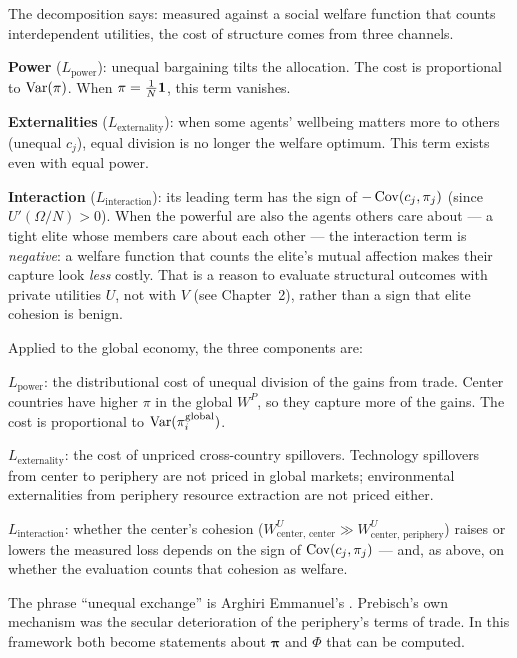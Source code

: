 \documentclass[../structural_economics_book.tex]{subfiles}
\begin{document}
\begin{intuition}
The decomposition says: measured against a social welfare function that counts interdependent utilities, the cost of structure comes from three channels.

\textbf{Power} ($L_{\text{power}}$): unequal bargaining tilts the allocation. The cost is proportional to $\operatorname{Var}(\pi)$. When $\pi = \frac{1}{N}\mathbf{1}$, this term vanishes.

\textbf{Externalities} ($L_{\text{externality}}$): when some agents' wellbeing matters more to others (unequal $c_j$), equal division is no longer the welfare optimum. This term exists even with equal power.

\textbf{Interaction} ($L_{\text{interaction}}$): its leading term has the sign of $-\operatorname{Cov}(c_j, \pi_j)$ (since $U'(\Omega/N) > 0$). When the powerful are also the agents others care about --- a tight elite whose members care about each other --- the interaction term is \textit{negative}: a welfare function that counts the elite's mutual affection makes their capture look \textit{less} costly. That is a reason to evaluate structural outcomes with private utilities $U$, not with $V$ (see Chapter~2), rather than a sign that elite cohesion is benign.
\end{intuition}

\begin{prebisch}
Applied to the global economy, the three components are:

$L_{\text{power}}$: the distributional cost of unequal division of the gains from trade. Center countries have higher $\pi$ in the global $W^P$, so they capture more of the gains. The cost is proportional to $\operatorname{Var}(\pi_i^{\text{global}})$.

$L_{\text{externality}}$: the cost of unpriced cross-country spillovers. Technology spillovers from center to periphery are not priced in global markets; environmental externalities from periphery resource extraction are not priced either.

$L_{\text{interaction}}$: whether the center's cohesion ($W^U_{\text{center, center}} \gg W^U_{\text{center, periphery}}$) raises or lowers the measured loss depends on the sign of $\operatorname{Cov}(c_j, \pi_j)$ --- and, as above, on whether the evaluation counts that cohesion as welfare.

The phrase ``unequal exchange'' is Arghiri Emmanuel's \citeyearpar{emmanuel1969echange}. Prebisch's own mechanism was the secular deterioration of the periphery's terms of trade. In this framework both become statements about $\boldsymbol{\pi}$ and $\Phi$ that can be computed.
\end{prebisch}
\end{document}
